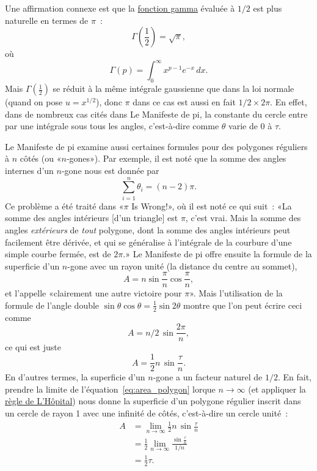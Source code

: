 Une affirmation connexe est que la
\href{https://fr.wikipedia.org/wiki/Fonction_gamma}{fonction gamma} évaluée à
$1/2$ est plus naturelle en termes de $\pi$~:
\[
\Gamma(\textstyle{\frac{1}{2}}) = \sqrt{\pi},
\]
où
\begin{equation}
\label{eq:gamma}
\Gamma(p) = \int_{0}^{\infty} x^{p-1} e^{-x}\,dx.
\end{equation}
Mais $\Gamma(\frac{1}{2})$ se réduit à la même intégrale gaussienne que dans la
loi normale (quand on pose $u = x^{1/2}$), donc $\pi$ dans ce cas est aussi
en fait $1/2\times 2\pi$. En effet, dans de nombreux cas cités dans Le
Manifeste de pi, la constante du cercle entre par une intégrale sous tous les
angles, c'est-à-dire comme $\theta$ varie de $0$ à $\tau$.

Le Manifeste de pi examine aussi certaines formules pour des polygones réguliers
à $n$ côtés (ou «\ns $n$-gones\ns »). Par exemple, il est noté que la somme des angles
internes d'un $n$-gone nous est donnée par
\[
\sum_{i=1}^n \theta_i=(n-2)\pi.
\]
Ce problème a été traité dans «\ns $\pi$ Is Wrong!\ns », où il est noté ce qui suit~:
«\ns La somme des angles intérieurs [d'un triangle] est $\pi$, c'est vrai. Mais la
somme des angles \emph{extérieurs} de \emph{tout} polygone, dont la somme des
angles intérieurs peut facilement être dérivée, et qui se généralise à
l'intégrale de la courbure d'une simple courbe fermée, est de $2\pi$.\ns » Le 
Manifeste de pi offre ensuite la formule de la superficie d'un $n$-gone avec un
rayon unité (la distance du centre au sommet),
\[ A=n\sin\frac{\pi}{n}\cos\frac{\pi}{n}, \]
et l'appelle «\ns clairement\textellipsis{} une autre victoire pour $\pi$\ns ». Mais
l'utilisation de la formule de l'angle double $\sin\theta\cos\theta =
\frac{1}{2}\sin2\theta$ montre que l'on peut écrire ceci comme
\[ A = n/2\, \sin\frac{2\pi}{n}, \]
ce qui est juste
\begin{equation}
\label{eq:area_polygon}
A = \frac{1}{2} n\, \sin\frac{\tau}{n}.
\end{equation}
En d'autres termes, la superficie d'un $n$-gone a un facteur
naturel de $1/2$. En fait, prendre la limite de
l'équation~\eqref{eq:area_polygon} lorque $n\rightarrow \infty$ (et appliquer la
\href{https://fr.wikipedia.org/wiki/R%C3%A8gle_de_L%27H%C3%B4pital}{règle de
L'Hôpital}) nous donne la superficie d'un polygone régulier inscrit dans un cercle de rayon 1 avec une infinité
de côtés, c'est-à-dire un cercle unité~:
\begin{equation}
\label{eq:lhopital}
\begin{split}
A & = \lim_{n\rightarrow\infty} \frac{1}{2} n\, \sin\frac{\tau}{n} \\
  & = \frac{1}{2} \lim_{n\rightarrow\infty} \frac{\sin\frac{\tau}{n}}{1/n} \\
  & = \tfrac{1}{2}\tau.
\end{split}
\end{equation}

